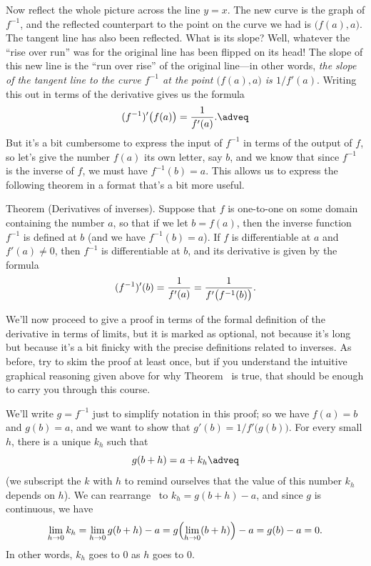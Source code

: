 Now reflect the whole picture across the line $y=x$. The new curve is the graph of $f^{-1}$, and the
reflected counterpart to the point on the curve we had is $\bigl( f(a), a\bigr)$. The tangent line has
also been reflected. What is its slope? Well, whatever the ``rise over run'' was for the original line
has been flipped on its head! The slope of this new line is the ``run over rise'' of the original line---in
other words, {\sl the slope of the tangent line to the curve $f^{-1}$ at the point $\bigl( f(a), a\bigr)$
is $1/f'(a)$}. Writing this out in terms of the derivative gives us the formula
\edef\eqfirstinverseformula{\the\eqcount}
$$ (f^{-1})'\bigl( f(a)\bigr) = {1\over f'(a)}.\adveq$$
But it's a bit cumbersome to express the input of $f^{-1}$ in terms of the output of $f$, so let's give
the number $f(a)$ its own letter, say $b$, and we know that since $f^{-1}$ is the inverse of $f$, we
must have $f^{-1}(b) = a$. This allows us to express the following theorem in a format that's a bit
more useful.

\edef\thmderivinverse{\the\thmcount}
\parenproclaim Theorem {\advthm} (Derivatives of inverses). Suppose that $f$ is one-to-one on some domain
containing the number $a$, so that if we let $b=f(a)$, then the inverse function $f^{-1}$ is defined
at $b$ (and we have $f^{-1}(b) = a$). If $f$ is differentiable at $a$ and $f'(a) \ne 0$,
then $f^{-1}$ is differentiable at $b$, and its derivative is given by the formula
$$(f^{-1})'(b) = {1\over f'(a)} =  {1\over f'\bigl( f^{-1}(b)\bigr)}.$$

We'll now proceed to give a proof in terms of the formal definition of the derivative in terms
of limits, but it is marked as optional, not because it's long but because it's a bit finicky
with the precise definitions related to inverses.
As before, try to skim the proof at least once, but if you
understand the intuitive graphical reasoning given above
for why Theorem~{\thmderivinverse} is true, that should be enough
to carry you through this course.

\optproof We'll write $g = f^{-1}$ just to simplify notation in this proof; so we have $f(a) = b$ and
$g(b) = a$, and we want to show that $g'(b) = 1/ f'\bigl( g(b)\bigr)$.
For every small $h$, there is a unique $k_h$ such that
\edef\eqkformula{\the\eqcount}
$$g(b+h) = a+k_h\adveq$$
(we subscript the $k$ with $h$ to
remind ourselves that the value of this number $k_h$ depends on $h$).
We can rearrange~\refeq{\eqkformula} to $k_h = g(b+h) - a$, and since
$g$ is continuous, we have
$$ \lim_{h\to 0} k_h = \lim_{h\to 0} g(b+h) - a = g\Bigl(\lim_{h\to 0} (b+h)\Bigr) - a = g(b) - a = 0.$$
In other words, $k_h$ goes to $0$ as $h$ goes to $0$.

